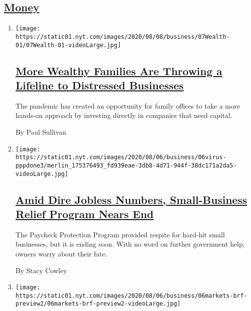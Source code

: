 \hypertarget{money}{%
\subsection{\texorpdfstring{\protect\hyperlink{}{Money}}{Money}}\label{money}}

\begin{enumerate}
\def\labelenumi{\arabic{enumi}.}
\item
  \texttt{[image: https://static01.nyt.com/images/2020/08/08/business/07Wealth-01/07Wealth-01-videoLarge.jpg]}

  \hypertarget{more-wealthy-families-are-throwing-a-lifeline-to-distressed-businesses}{%
  \subsection{\texorpdfstring{\href{/2020/08/07/your-money/family-office-direct-investment.html}{More
  Wealthy Families Are Throwing a Lifeline to Distressed
  Businesses}}{More Wealthy Families Are Throwing a Lifeline to Distressed Businesses}}\label{more-wealthy-families-are-throwing-a-lifeline-to-distressed-businesses}}

  The pandemic has created an opportunity for family offices to take a
  more hands-on approach by investing directly in companies that need
  capital.

  By Paul Sullivan
\item
  \texttt{[image: https://static01.nyt.com/images/2020/08/06/business/06virus-pppdone3/merlin\_175376493\_fd939eae-3db8-4d71-944f-38dc171a2da5-videoLarge.jpg]}

  \hypertarget{amid-dire-jobless-numbers-small-business-relief-program-nears-end}{%
  \subsection{\texorpdfstring{\href{/2020/08/06/business/small-businesses-relief-program-ending.html}{Amid
  Dire Jobless Numbers, Small-Business Relief Program Nears
  End}}{Amid Dire Jobless Numbers, Small-Business Relief Program Nears End}}\label{amid-dire-jobless-numbers-small-business-relief-program-nears-end}}

  The Paycheck Protection Program provided respite for hard-hit small
  businesses, but it is ending soon. With no word on further government
  help, owners worry about their fate.

  By Stacy Cowley
\item
  \texttt{[image: https://static01.nyt.com/images/2020/08/06/business/06markets-brf-preview2/06markets-brf-preview2-videoLarge.jpg]}


\end{enumerate}

